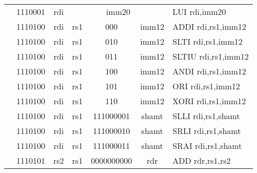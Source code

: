\begin{table}[p]
\begin{small}
\begin{center}
\begin{tabular}{rcccccccccccl}
&
\multicolumn{2}{|c|}{1110001} &
\multicolumn{1}{c|}{rdi} &
\multicolumn{8}{c|}{imm20} & LUI rdi,imm20 \\
\cline{2-12}
  

&
\multicolumn{2}{|c|}{1110100} &
\multicolumn{1}{c|}{rdi} &
\multicolumn{1}{c|}{rs1} &
\multicolumn{2}{c|}{000} &
\multicolumn{5}{c|}{imm12} & ADDI rdi,rs1,imm12 \\
\cline{2-12}
  

&
\multicolumn{2}{|c|}{1110100} &
\multicolumn{1}{c|}{rdi} &
\multicolumn{1}{c|}{rs1} &
\multicolumn{2}{c|}{010} &
\multicolumn{5}{c|}{imm12} & SLTI rdi,rs1,imm12 \\
\cline{2-12}
  

&
\multicolumn{2}{|c|}{1110100} &
\multicolumn{1}{c|}{rdi} &
\multicolumn{1}{c|}{rs1} &
\multicolumn{2}{c|}{011} &
\multicolumn{5}{c|}{imm12} & SLTIU rdi,rs1,imm12 \\
\cline{2-12}
  

&
\multicolumn{2}{|c|}{1110100} &
\multicolumn{1}{c|}{rdi} &
\multicolumn{1}{c|}{rs1} &
\multicolumn{2}{c|}{100} &
\multicolumn{5}{c|}{imm12} & ANDI rdi,rs1,imm12 \\
\cline{2-12}
  

&
\multicolumn{2}{|c|}{1110100} &
\multicolumn{1}{c|}{rdi} &
\multicolumn{1}{c|}{rs1} &
\multicolumn{2}{c|}{101} &
\multicolumn{5}{c|}{imm12} & ORI rdi,rs1,imm12 \\
\cline{2-12}
  

&
\multicolumn{2}{|c|}{1110100} &
\multicolumn{1}{c|}{rdi} &
\multicolumn{1}{c|}{rs1} &
\multicolumn{2}{c|}{110} &
\multicolumn{5}{c|}{imm12} & XORI rdi,rs1,imm12 \\
\cline{2-12}
  

&
\multicolumn{2}{|c|}{1110100} &
\multicolumn{1}{c|}{rdi} &
\multicolumn{1}{c|}{rs1} &
\multicolumn{5}{c|}{111000001} &
\multicolumn{2}{c|}{shamt} & SLLI rdi,rs1,shamt \\
\cline{2-12}
  

&
\multicolumn{2}{|c|}{1110100} &
\multicolumn{1}{c|}{rdi} &
\multicolumn{1}{c|}{rs1} &
\multicolumn{5}{c|}{111000010} &
\multicolumn{2}{c|}{shamt} & SRLI rdi,rs1,shamt \\
\cline{2-12}
  

&
\multicolumn{2}{|c|}{1110100} &
\multicolumn{1}{c|}{rdi} &
\multicolumn{1}{c|}{rs1} &
\multicolumn{5}{c|}{111000011} &
\multicolumn{2}{c|}{shamt} & SRAI rdi,rs1,shamt \\
\cline{2-12}
  

&
\multicolumn{2}{|c|}{1110101} &
\multicolumn{1}{c|}{rs2} &
\multicolumn{1}{c|}{rs1} &
\multicolumn{6}{c|}{0000000000} &
\multicolumn{1}{c|}{rdr} & ADD rdr,rs1,rs2 \\
\cline{2-12}
  


\end{tabular}
\end{center}
\end{small}
\end{table}
